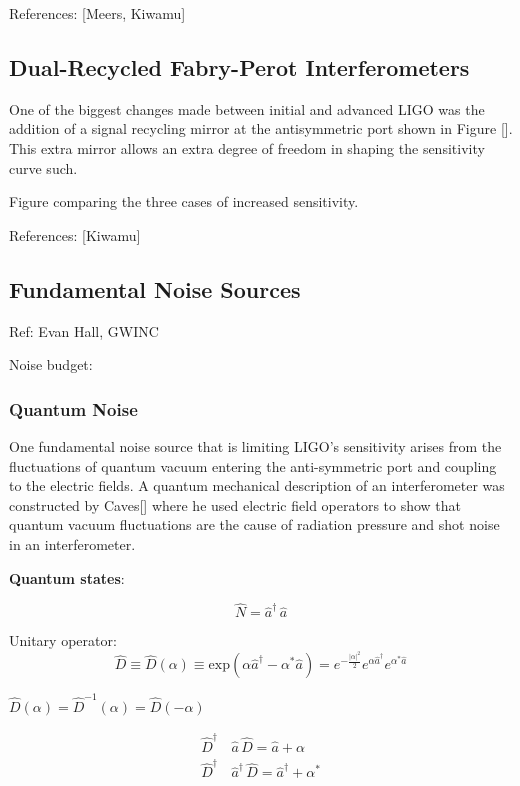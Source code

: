 		
		
		References: [Meers, Kiwamu]
		
		\subsection{Dual-Recycled Fabry-Perot Interferometers}
		
		One of the biggest changes made between initial and advanced LIGO was the addition of a signal recycling mirror at the antisymmetric port shown in Figure []. This extra mirror allows an extra degree of freedom in shaping the sensitivity curve such.
		
		
		Figure comparing the three cases of increased sensitivity.
		
		References: [Kiwamu]
		
		\subsection{Fundamental Noise Sources}
		Ref: Evan Hall, GWINC

		Noise budget:
		
		\subsubsection{Quantum Noise}
		One fundamental noise source that is limiting LIGO's sensitivity arises from the fluctuations of quantum vacuum entering the anti-symmetric port and coupling to the electric fields.  A quantum mechanical description of an interferometer was constructed by Caves[] where he used electric field operators to show that quantum vacuum fluctuations are the cause of radiation pressure and shot noise in an interferometer.
		
		\textbf{Quantum states}:
		
		\begin{equation}
		\hat{N} = \hat{a}^{\dagger} \, \hat{a}
		\end{equation}
		
		
		Unitary operator:
		\begin{equation}
		\hat{D} \equiv \hat{D}(\alpha) \equiv \text{exp}(\alpha \hat{a}^{\dagger} - \alpha^{*} \hat{a} ) = e^{-\frac{\vert{\alpha}\vert^2}{2}} e^{\alpha \hat{a}^{\dagger} } e^{\alpha^{*} \hat{a} }
		\end{equation}

		$\hat{D}(\alpha) = \hat{D}^{-1}(\alpha) = \hat{D}(-\alpha)$
		
		\begin{equation}
		\begin{aligned}
		\hat{D}^\dagger&\, \hat{a} 		\,\hat{D}			= \hat{a} + \alpha \\ 
		\hat{D}^\dagger&\, \hat{a}^\dagger \,\hat{D} 		= \hat{a}^\dagger + \alpha^*
		\end{aligned}
		\end{equation}
		
